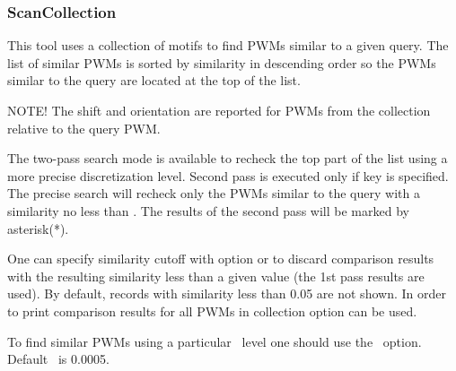 \subsubsection{ScanCollection}
This tool uses a collection of motifs to find PWMs similar to a given query. 
The list of similar PWMs is sorted by similarity in descending order so the PWMs similar to the query are 
located at the top of the list.

NOTE! The shift and orientation are reported for PWMs from the collection relative to the query 
PWM.


The two-pass search mode is available to recheck the top part of the list using a more precise discretization level. Second pass is executed only 
if 
key is specified. The precise search will recheck only the PWMs 
similar to the query with a similarity no less than . The results of the second pass 
will be marked by asterisk(*).

One can specify similarity cutoff with option  or  to discard 
comparison results with the resulting similarity less than a given value (the 1st pass results are used). 
By default, records with similarity less than 0.05 are not shown.
In order to print comparison results for all PWMs in collection  option can be used.


To find similar PWMs using a particular \pvalue\ level one should use the ~option. Default \pvalue\ is 0.0005.

\exampleof{}
